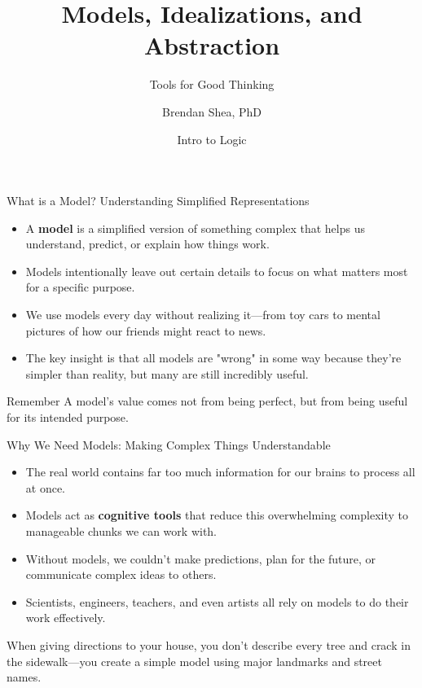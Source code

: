 \documentclass{beamer}
\title{Models, Idealizations, and Abstraction}
\subtitle{Tools for Good Thinking}
\author{Brendan Shea, PhD}
\date{Intro to Logic}
\begin{document}
	
	\frame{\titlepage}
	
	\begin{frame}{What is a Model? Understanding Simplified Representations}
		\begin{itemize}
			\item A \textbf{model} is a simplified version of something complex that helps us understand, predict, or explain how things work.
			\item Models intentionally leave out certain details to focus on what matters most for a specific purpose.
			\item We use models every day without realizing it—from toy cars to mental pictures of how our friends might react to news.
			\item The key insight is that all models are "wrong" in some way because they're simpler than reality, but many are still incredibly useful.
		\end{itemize}
		
		\begin{block}{Remember}
			A model's value comes not from being perfect, but from being useful for its intended purpose.
		\end{block}
	\end{frame}
	
	\begin{frame}{Why We Need Models: Making Complex Things Understandable}
		\begin{itemize}
			\item The real world contains far too much information for our brains to process all at once.
			\item Models act as \textbf{cognitive tools} that reduce this overwhelming complexity to manageable chunks we can work with.
			\item Without models, we couldn't make predictions, plan for the future, or communicate complex ideas to others.
			\item Scientists, engineers, teachers, and even artists all rely on models to do their work effectively.
		\end{itemize}
		
		\begin{example}
			When giving directions to your house, you don't describe every tree and crack in the sidewalk—you create a simple model using major landmarks and street names.
		\end{example}
	\end{frame}
	
\end{document}
